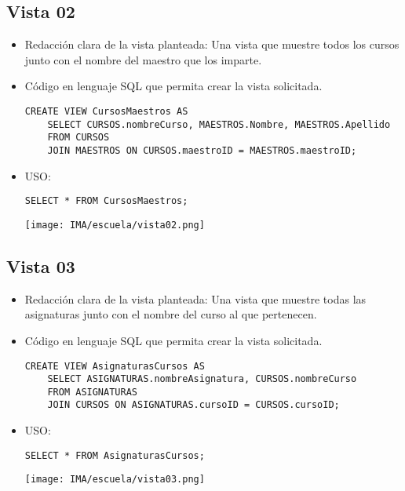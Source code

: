 \subsection*{Vista 02}

\begin{itemize}
  \item Redacción clara de la vista planteada: Una vista que muestre todos los cursos junto con el nombre del maestro que los imparte.
  \item Código en lenguaje SQL que permita crear la vista solicitada.
  
  \begin{lstlisting}[caption={Tablas para la BdDatos}, label={lst:sql_estadios}]
    CREATE VIEW CursosMaestros AS
    SELECT CURSOS.nombreCurso, MAESTROS.Nombre, MAESTROS.Apellido
    FROM CURSOS
    JOIN MAESTROS ON CURSOS.maestroID = MAESTROS.maestroID;
  \end{lstlisting}    
  
  \item USO:
  
  \begin{lstlisting}[caption={Tablas para la BdDatos}, label={lst:sql_estadios}]
    SELECT * FROM CursosMaestros;
  \end{lstlisting}    

  \begin{center}
    \texttt{[image: IMA/escuela/vista02.png]}
  \end{center}
\end{itemize}


\subsection*{Vista 03}

\begin{itemize}
  \item Redacción clara de la vista planteada: Una vista que muestre todas las asignaturas junto con el nombre del curso al que pertenecen.
  \item Código en lenguaje SQL que permita crear la vista solicitada.
  
  \begin{lstlisting}[caption={Tablas para la BdDatos}, label={lst:sql_estadios}]
    CREATE VIEW AsignaturasCursos AS
    SELECT ASIGNATURAS.nombreAsignatura, CURSOS.nombreCurso
    FROM ASIGNATURAS
    JOIN CURSOS ON ASIGNATURAS.cursoID = CURSOS.cursoID;
  \end{lstlisting}    
  
  \item USO:
  
  \begin{lstlisting}[caption={Tablas para la BdDatos}, label={lst:sql_estadios}]
    SELECT * FROM AsignaturasCursos;
  \end{lstlisting}    

  \begin{center}
    \texttt{[image: IMA/escuela/vista03.png]}
  \end{center}
\end{itemize}